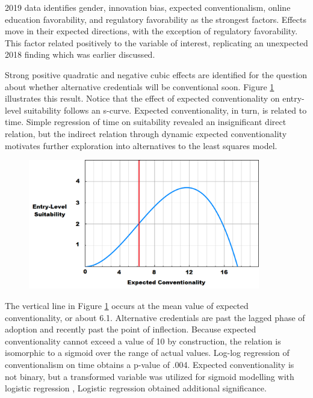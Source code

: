 \documentclass[AER]{./aea-latex-templates/AEA}
\begin{document}
2019 data identifies gender, innovation bias, expected
conventionalism, online education favorability, and regulatory
favorability as the strongest factors. Effects move in their expected directions,
with the exception of regulatory favorability.
This factor related positively to the variable of interest, replicating an unexpected 2018 finding which was earlier discussed.

Strong positive quadratic and negative cubic effects are identified for
the question about whether alternative credentials will be conventional soon.
Figure \ref{fig:expect_convention_voi} illustrates this result. Notice that the effect of expected conventionality on entry-level suitability follows an s-curve.
Expected conventionality, in turn, is related to time.
Simple regression of time on suitability revealed an insignificant direct relation,
but the indirect relation through dynamic expected conventionality motivates further exploration into alternatives to the least squares model.

\begin{figure}[h!]
    \centering
     \includegraphics[width=0.9\textwidth]{./figures-and-tables/figure-3.png}
    \label{fig:expect_convention_voi}
    \end{figure}

The vertical line in Figure \ref{fig:expect_convention_voi} occurs at the mean value of expected conventionality, or about 6.1.
Alternative credentials are past the lagged phase of adoption and recently past the
point of inflection. Because expected conventionality cannot exceed a value of 10 by
construction, the relation is isomorphic to a sigmoid over the range of actual values.
Log-log regression of conventionalism on time obtains a p-value of .004.
Expected conventionality is not binary,
but a transformed variable was utilized for sigmoid modelling with logistic regression \cite{cox2008stata},
Logistic regression obtained additional significance.
\end{document}
